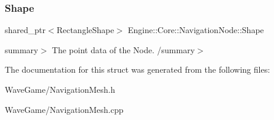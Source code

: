 \subsubsection{\texorpdfstring{Shape}{Shape}}
{\footnotesize\ttfamily shared\+\_\+ptr$<$Rectangle\+Shape$>$ Engine\+::\+Core\+::\+Navigation\+Node\+::\+Shape}

summary$>$ The point data of the Node. /summary$>$ 

The documentation for this struct was generated from the following files\+:\begin{DoxyCompactItemize}
\item 
Wave\+Game/Navigation\+Mesh.\+h\item 
Wave\+Game/Navigation\+Mesh.\+cpp\end{DoxyCompactItemize}
